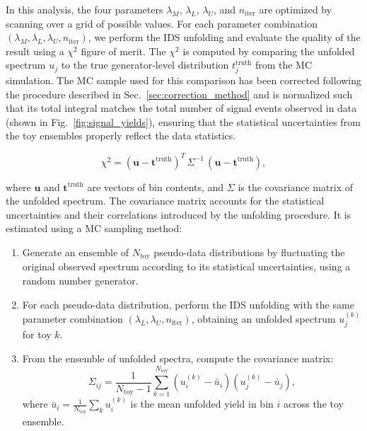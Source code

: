 In this analysis, the four parameters $\lambda_M$, $\lambda_L$, $\lambda_U$,
and $n_{\text{iter}}$ are optimized by scanning over a grid of possible values.
For each parameter combination $(\lambda_M, \lambda_L, \lambda_U,
    n_{\text{iter}})$, we perform the IDS unfolding and evaluate the quality of the
result using a $\chi^2$ figure of merit. The $\chi^2$ is computed by comparing
the unfolded spectrum $u_j$ to the true generator-level distribution
$t_j^{\text{truth}}$ from the MC simulation. The MC sample used for this
comparison has been corrected following the procedure described in
Sec.~\ref{sec:correction_method} and is normalized such that its total integral
matches the total number of signal events observed in data (shown in
Fig.~\ref{fig:signal_yields}), ensuring that the statistical uncertainties from
the toy ensembles properly reflect the data statistics.

\begin{equation}
    \chi^2 = \left( \mathbf{u} - \mathbf{t}^{\text{truth}} \right)^T \, \Sigma^{-1} \, \left( \mathbf{u} - \mathbf{t}^{\text{truth}} \right),
    \label{eq:chi2_fom}
\end{equation}

where $\mathbf{u}$ and $\mathbf{t}^{\text{truth}}$ are vectors of bin contents,
and $\Sigma$ is the covariance matrix of the unfolded spectrum. The covariance
matrix accounts for the statistical uncertainties and their correlations
introduced by the unfolding procedure. It is estimated using a MC sampling
method:

\begin{enumerate}
    \item Generate an ensemble of $N_{\text{toy}}$ pseudo-data distributions by
          fluctuating the original observed spectrum according to its statistical
          uncertainties, using a random number generator.
    \item For each pseudo-data distribution, perform the IDS unfolding with the same
          parameter combination $(\lambda_L, \lambda_U, n_{\text{iter}})$, obtaining an
          unfolded spectrum $u_j^{(k)}$ for toy $k$.
    \item From the ensemble of unfolded spectra, compute the covariance matrix:
          \begin{equation}
              \Sigma_{ij} = \frac{1}{N_{\text{toy}} - 1} \sum_{k=1}^{N_{\text{toy}}} \left( u_i^{(k)} - \bar{u}_i \right) \left( u_j^{(k)} - \bar{u}_j \right),
              \label{eq:covariance_mc}
          \end{equation}
          where $\bar{u}_i = \frac{1}{N_{\text{toy}}} \sum_{k} u_i^{(k)}$ is the mean unfolded yield in bin $i$ across the toy ensemble.
\end{enumerate}

